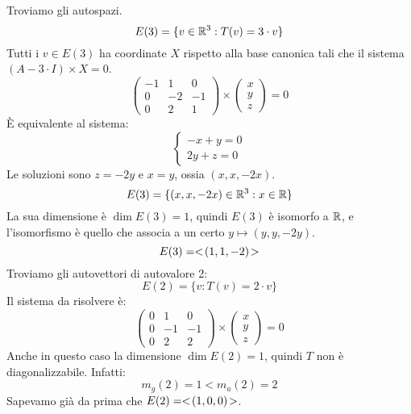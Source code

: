 \begin{exmp}
Troviamo gli autospazi.
\[
E(3) = \{ v \in \mathbb{R}^3 : T(v) = 3 \cdot v \}
\]
Tutti i $v \in E(3)$ ha coordinate $X$ rispetto alla base canonica tali che il sistema $(A - 3 \cdot I) \times X = 0$.
\[
\begin{pmatrix}
-1 & 1 & 0 \\
0 & -2 & -1 \\
0 & 2 & 1
\end{pmatrix}
\times
\begin{pmatrix}
x \\ y \\ z 
\end{pmatrix} = 0 
\]
\`E equivalente al sistema:
\[
\begin{cases}
-x + y = 0 \\
2y + z = 0
\end{cases}
\]
Le soluzioni sono $z = - 2 y$ e $x = y$, ossia $(x, x, -2x)$.
\[
E(3) = \{ (x,x,-2x) \in \mathbb{R}^3 : x \in \mathbb{R} \}
\]
La sua dimensione \`e $\dim E(3) = 1$, quindi $E(3)$ \`e isomorfo a $\mathbb{R}$, e l'isomorfismo \`e quello che associa a un certo $y \mapsto (y, y, -2y)$.
\[
E(3) = <\!{(1,1,-2)}\!>
\]
Troviamo gli autovettori di autovalore 2:
\[
E(2) = \{ v : T(v) = 2 \cdot v \}
\]
Il sistema da risolvere \`e:
\[
\begin{pmatrix}
0 & 1 & 0 \\
0 & -1 & -1 \\
0 & 2 & 2
\end{pmatrix}
\times
\begin{pmatrix}
x \\ y \\ z
\end{pmatrix} = 0
\]
Anche in questo caso la dimensione $\dim E(2) = 1$, quindi $T$ non \`e diagonalizzabile. Infatti:
\[
m_g(2) = 1 < m_a(2) = 2
\]
Sapevamo gi\`a da prima che $E(2) = <\!{(1,0,0)}\!>$.
\end{exmp}














